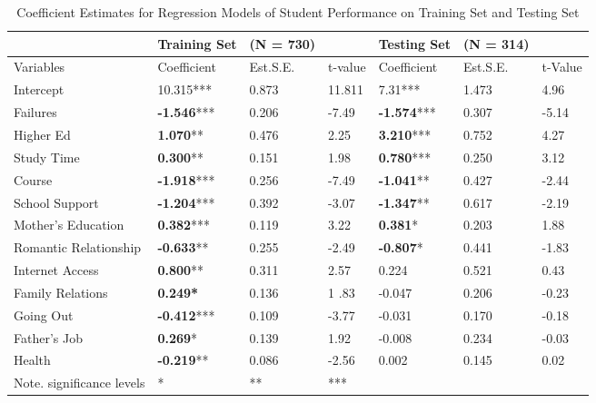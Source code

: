 \documentclass[sigconf]{acmart}
\begin{document}
\begin{table*}[ht]
  \caption{Coefficient Estimates for Regression Models of Student Performance on 
  Training Set and Testing Set}
  \label{tab:freq}
  \begin{tabular}{lllllll}
    \toprule
     & Training Set & (N = 730)&& Testing Set& (N = 314)&  \\
    \midrule
    Variables & Coefficient & Est.S.E. & t-value & Coefficient & Est.S.E.& t-Value  \\
    \midrule
    Intercept           &       10.315***    & 0.873 & 11.811 &          7.31***    & 1.473 &  4.96 \\
    Failures            & \textbf{-1.546}*** & 0.206 & -7.49  & \textbf{-1.574}***  & 0.307 & -5.14 \\
    Higher Ed           & \textbf{ 1.070}**  & 0.476 &   2.25 & \textbf{ 3.210}***  & 0.752 &  4.27 \\
    Study Time          & \textbf{ 0.300}**  & 0.151 &   1.98 & \textbf{ 0.780}***  & 0.250 &  3.12 \\
    Course              & \textbf{-1.918}*** & 0.256 & -7.49  & \textbf{-1.041}**   & 0.427 & -2.44 \\
    School Support      & \textbf{-1.204}*** & 0.392 & -3.07  & \textbf{-1.347}**   & 0.617 & -2.19 \\
    Mother's Education  & \textbf{ 0.382}*** & 0.119 &   3.22 & \textbf{ 0.381}*    & 0.203 &  1.88 \\
    Romantic Relationship& \textbf{-0.633}** & 0.255 &  -2.49 & \textbf{-0.807}*    & 0.441 & -1.83 \\
    Internet Access     & \textbf{ 0.800}**  & 0.311 &   2.57 &          0.224      & 0.521 &  0.43 \\
    Family Relations    & \textbf{ 0.249*}   & 0.136 &  1 .83 &         -0.047      & 0.206 & -0.23 \\
    Going Out           & \textbf{-0.412}*** & 0.109 &  -3.77 &         -0.031      & 0.170 & -0.18 \\
    Father's Job        & \textbf{ 0.269}*   & 0.139 &   1.92 &         -0.008      & 0.234 & -0.03 \\
    Health              & \textbf{-0.219}**  & 0.086 &  -2.56 &          0.002      & 0.145 &  0.02 \\
    \bottomrule
    Note. significance levels & *\<0.10           & **\<0.05  & ***\<0.01 & & &
  \end{tabular}
\end{table*}
\end{document}
